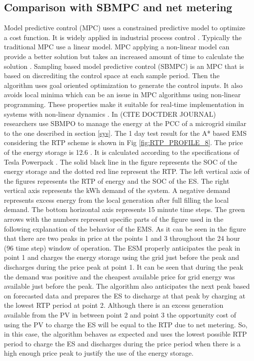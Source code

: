 \subsection{Comparison with SBMPC and net metering}
Model predictive control (MPC) uses a constrained predictive model to optimize a cost function. It is widely applied in industrial process control \cite{qin1997overview}. Typically the traditional MPC use a linear model. MPC applying a non-linear model can provide a better solution but takes an increased amount of time to calculate the solution \cite{berber2012nonlinear,dunlap2008sampling}. Sampling based model predictive control (SBMPC) \cite{dunlap2011book} is an MPC that is based on discrediting the control space at each sample period. Then the algorithm uses goal oriented optimization to generate the control inputs. It also avoids local minima which can be an issue in MPC algorithms using non-linear programming. These properties make it suitable for real-time implementation in systems with non-linear dynamics \cite{dunlap2008sampling}. In \colorbox{BurntOrange}{(CITE DOCTDER JOURNAL)} researchers use SBMPO to manage the energy at the PCC of a microgrid similar to the one described in section \ref{sys}. The 1 day test result for the A* based EMS considering the RTP scheme is shown in Fig \ref{fig:RTP_PROFILE_8}. The price of the energy storage is 12.6 \cent. It is calculated according to the specifications of Tesla Powerpack \cite{tesla_powerpack_2018}. The solid black line in the figure represents the SOC of the energy storage and the dotted red line represent the RTP. The left vertical axis of the figures represents the RTP of energy and the SOC of the ES. The right vertical axis represents the kWh demand of the system. A negative demand represents excess energy from the local generation after full filling the local demand. The bottom horizontal axis represents 15 minute time steps. The green arrows with the numbers represent specific parts of the figure used in the following explanation of the behavior of the EMS. As it can be seen in the figure that there are two peaks in price at the points 1 and 3 throughout the 24 hour (96 time step) window of operation.  The ESM properly anticipates the peak in point 1 and charges the energy storage using the grid just before the peak and discharges during the price peak at point 1. It can be seen that during the peak the demand was positive and the cheapest available price for grid energy was available just before the peak. The algorithm also anticipates the next peak based on forecasted data and prepares the ES to discharge at that peak by charging at the lowest RTP period at point 2. Although there is an excess generation available from the PV in between point 2 and point 3 the opportunity cost of using the PV to charge the ES will be equal to the RTP due to net metering. So, in this case, the algorithm behaves as expected and uses the lowest possible RTP period to charge the ES and discharges during the price period when there is a high enough price peak to justify the use of the energy storage.
 
